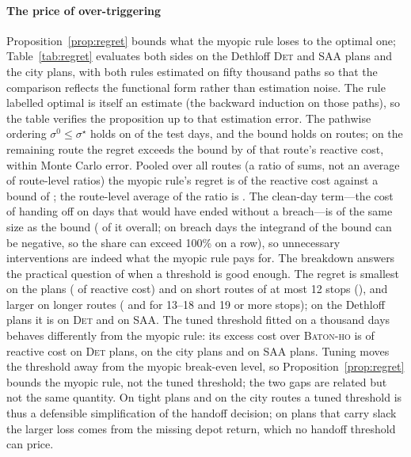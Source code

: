 \documentclass[preprint,authoryear,12pt]{elsarticle}
\theoremstyle{definition}
\theoremstyle{remark}
\begin{document}
\paragraph{The price of over-triggering} Proposition~\ref{prop:regret}
bounds what the myopic rule loses to the optimal one; Table~\ref{tab:regret}
evaluates both sides on the Dethloff \textsc{Det} and \textsc{SAA} plans
and the city plans, with both rules estimated on fifty thousand paths
so that the comparison reflects the functional form rather than
estimation noise. The rule labelled optimal is itself an estimate (the
backward induction on those paths), so the table verifies the
proposition up to that estimation error. The pathwise ordering $\sigma^0 \le \sigma^\star$
holds on \regretContained{} of the test days, and the bound holds on
\regretBoundHolds{} routes; on the \regretBoundFail{} remaining route
the regret exceeds the bound by \regretFailMax{} of that route's reactive
cost, within Monte Carlo error. Pooled over all routes (a ratio of sums,
not an average of route-level ratios) the myopic rule's regret is
\regretAll{} of the reactive cost against a bound of \regretBoundAll{};
the route-level average of the ratio is \regretRouteMean. The clean-day
term---the cost of handing off on days that would have ended without a
breach---is of the same size as the bound (\regretCleanShare{} of it
overall; on breach days the integrand of the bound can be negative, so
the share can exceed 100\% on a row), so unnecessary interventions are
indeed what the myopic rule pays for. The breakdown answers the
practical question of when a threshold is good enough. The regret is
smallest on the \regretMinRow{} plans (\regretMin{} of reactive cost)
and on short routes of at most 12 stops (\regretShort{}), and larger on
longer routes (\regretMid{} and \regretLong{} for 13--18 and 19 or more
stops); on the Dethloff plans it is \regretDet{} on \textsc{Det} and
\regretSaa{} on \textsc{SAA}. The tuned threshold fitted on a thousand
days behaves differently from the myopic rule: its excess cost over
\textsc{Baton-ho} is \thrGapDet{} of reactive cost on \textsc{Det}
plans, \thrGapCity{} on the city plans and \thrGapSaa{} on \textsc{SAA}
plans. Tuning moves the threshold away from the myopic break-even level,
so Proposition~\ref{prop:regret} bounds the myopic rule, not the tuned
threshold; the two gaps are related but not the same quantity. On tight
plans and on the city routes a tuned threshold is thus a defensible
simplification of the handoff decision; on plans that carry slack the
larger loss comes from the missing depot return, which no handoff
threshold can price.
\end{document}
